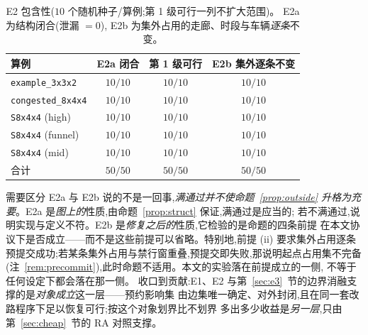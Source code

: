 \documentclass[manuscript,screen,review]{acmart}
\newcommand{\NSeeds}{10}
\newcommand{\NPairs}{50}
\newcommand{\PassClosed}{\NPairs/\NPairs}    %
\newcommand{\PassInvar}{\NPairs/\NPairs}     %
\begin{document}
\begin{table}[t]
\centering
\caption{E2 包含性(\(\NSeeds\) 个随机种子/算例;第 1 级可行一列不扩大范围)。
E2a 为结构闭合(泄漏 \(=0\)),
E2b 为集外占用的走廊、时段与车辆\emph{逐条}不变。}
\label{tab:e2}
\small
\begin{tabular}{@{}lccc@{}}
\toprule
算例 & E2a 闭合 & 第 1 级可行 & E2b 集外逐条不变 \\
\midrule
\texttt{example\_3x3x2}   & \(10/10\) & \(10/10\) & \(10/10\) \\
\texttt{congested\_8x4x4} & \(10/10\) & \(10/10\) & \(10/10\) \\
\texttt{S8x4x4} (high)    & \(10/10\) & \(10/10\) & \(10/10\) \\
\texttt{S8x4x4} (funnel)  & \(10/10\) & \(10/10\) & \(10/10\) \\
\texttt{S8x4x4} (mid)     & \(10/10\) & \(10/10\) & \(10/10\) \\
\midrule
合计 & \(\PassClosed\) & \(\NPairs/\NPairs\) & \(\PassInvar\) \\
\bottomrule
\end{tabular}
\end{table}

需要区分 E2a 与 E2b 说的不是一回事,\emph{满通过并不使命题~\ref{prop:outside}
升格为充要}。E2a 是\emph{图上的}性质,由命题~\ref{prop:struct} 保证,满通过是应当的;
若不满通过,说明实现与定义不符。E2b 是\emph{修复之后的}性质,它检验的是命题的四条前提
在本文协议下是否成立——而不是这些前提可以省略。特别地,前提 (ii) 要求集外占用逐条
预提交成功;若某条集外占用与禁行窗重叠,预提交即失败,那说明起点占用集不完备
(注~\ref{rem:precommit}),此时命题不适用。本文的实验落在前提成立的一侧,
不等于任何设定下都会落在那一侧。
收口到贡献:E1、E2 与第~\ref{sec:e3}~节的边界消融支撑的是\emph{对象成立}这一层——预约影响集
由边集唯一确定、对外封闭,且在同一套改路程序下足以恢复可行;按这个对象划界比不划界
多出多少收益是\emph{另一层},只由第~\ref{sec:cheap}~节的 RA 对照支撑。
\end{document}
